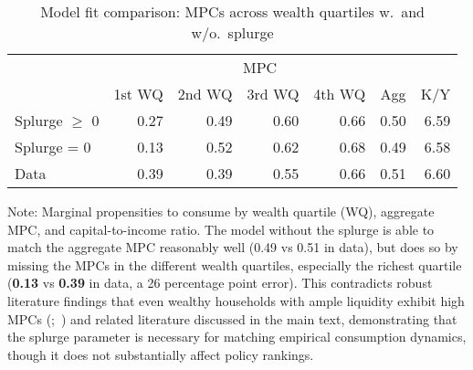 \documentclass{econsocart}
\begin{document}
\begin{table}[tb] 
  \caption{Model fit comparison: MPCs across wealth quartiles w.\ and w/o.\ splurge}
  \label{tab:Comparison-Splurge-Table} 
  \centering

  \begin{tabular*}
    {\textwidth}{@{\extracolsep{\fill}}lrrrrrr@{}} 
    \hline
    & \multicolumn{5}{c}{MPC} & \\
    & \multicolumn{1}{c}{1st WQ} & \multicolumn{1}{c}{2nd WQ} & \multicolumn{1}{c}{3rd WQ} & \multicolumn{1}{c}{4th WQ} & \multicolumn{1}{c}{Agg} & \multicolumn{1}{c}{K/Y} \\ \hline
    Splurge $\geq$ 0      & 0.27 & 0.49 & 0.60 & 0.66 & 0.50 & 6.59 \\
    Splurge = 0           & 0.13 & 0.52 & 0.62 & 0.68 & 0.49 & 6.58 \\
    \addlinespace
    Data                  & 0.39 & 0.39 & 0.55 & 0.66 & 0.51 & 6.60 \\
    \hline
  \end{tabular*}

  \noindent\parbox{\textwidth}{
    \medskip
    \footnotesize Note: Marginal propensities to consume by wealth quartile (WQ), aggregate MPC, and capital-to-income ratio. The model without the splurge is able to match the aggregate MPC reasonably well (0.49 vs 0.51 in data), but does so by missing the MPCs in the different wealth quartiles, especially the richest quartile (\textbf{0.13} vs \textbf{0.39} in data, a 26 percentage point error). This contradicts robust literature findings that even wealthy households with ample liquidity exhibit high MPCs (\cite{crawley2023MicroMacro};~\cite{graham2024mental}) and related literature discussed in the main text, demonstrating that the splurge parameter is necessary for matching empirical consumption dynamics, though it does not substantially affect policy rankings.
  }
\end{table}

\vspace{0.5em}
\end{document}
